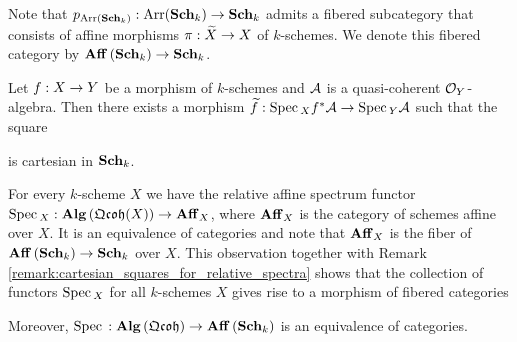 \begin{example}\label{example:fibered_category_of_affine_schemes}
Note that $p_{\mathrm{Arr}(\mathbf{Sch}_k)}:\mathrm{Arr}(\mathbf{Sch}_k)\rightarrow \mathbf{Sch}_k$ admits a fibered subcategory that consists of affine morphisms $\pi:\widetilde{X}\rightarrow X$ of $k$-schemes. We denote this fibered category by $\mathbf{Aff}\left(\mathbf{Sch}_k\right)\rightarrow \mathbf{Sch}_k$.
\end{example}

\begin{remark}\label{remark:cartesian_squares_for_relative_spectra}
Let $f:X\rightarrow Y$ be a morphism of $k$-schemes and ${\mathcal A}$ is a quasi-coherent ${\mathcal O}_Y$-algebra. Then there exists a morphism $\widetilde{f}:\mathrm{Spec}\,_X f^*{\mathcal A}\rightarrow \mathrm{Spec}\,_Y{\mathcal A}$ such that the square
\begin{center}
\end{center}
is cartesian in $\mathbf{Sch}_k$.
\end{remark}

\begin{example}\label{example:from_qc_algebras_to_the_category_of_arrows_over_schemes}
For every $k$-scheme $X$ we have the relative affine spectrum functor $\mathrm{Spec}\,_X:\mathbf{Alg}\left(\mathfrak{Qcoh}(X)\right)\rightarrow \mathbf{Aff}_X$, where $\mathbf{Aff}_X$ is the category of schemes affine over $X$. It is an equivalence of categories and note that $\mathbf{Aff}_X$ is the fiber of $\mathbf{Aff}\left(\mathbf{Sch}_k\right)\rightarrow \mathbf{Sch}_k$ over $X$. This observation together with Remark \ref{remark:cartesian_squares_for_relative_spectra} shows that the collection of functors $\mathrm{Spec}\,_X$ for all $k$-schemes $X$ gives rise to a morphism of fibered categories
\begin{center}
\end{center}
Moreover, $\mathrm{Spec}\,:\mathbf{Alg}\left(\mathfrak{Qcoh}\right)\rightarrow \mathbf{Aff}\left(\mathbf{Sch}_k\right)$ is an equivalence of categories.
\end{example}

